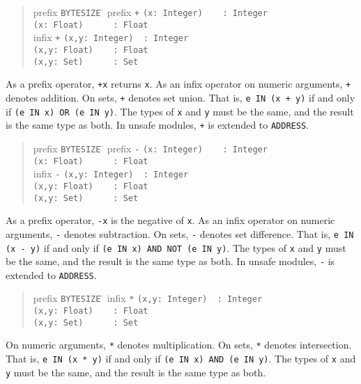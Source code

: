 \documentclass[10pt]{article}
\begin{document}
\begin{quote}
  \begin{tabbing}
    prefix \= \verb|BYTESIZE| \= \kill
    prefix \> \verb|+|       \> \verb|(x: Integer)    : Integer| \\
           \>                \> \verb|(x: Float)      : Float| \\
    infix  \> \verb|+|       \> \verb|(x,y: Integer)  : Integer| \\
           \>                \> \verb|(x,y: Float)    : Float| \\
           \>                \> \verb|(x,y: Set)      : Set|
  \end{tabbing}
\end{quote}
As a prefix operator, \verb|+x| returns \verb|x|.  As an infix operator on
numeric arguments, \verb|+| denotes addition.  On sets, \verb|+| denotes set
union.  That is, \verb|e IN (x + y)| if and only if
\verb|(e IN x) OR (e IN y)|.  The types of \verb|x| and \verb|y| must be the
same, and the result is the same type as both.  In unsafe modules, \verb|+| is
extended to \verb|ADDRESS|.

\begin{quote}
  \begin{tabbing}
    prefix \= \verb|BYTESIZE| \= \kill
    prefix \> \verb|-|       \> \verb|(x: Integer)    : Integer| \\
           \>                \> \verb|(x: Float)      : Float| \\
    infix  \> \verb|-|       \> \verb|(x,y: Integer)  : Integer| \\
           \>                \> \verb|(x,y: Float)    : Float| \\
           \>                \> \verb|(x,y: Set)      : Set|
  \end{tabbing}
\end{quote}
As a prefix operator, \verb|-x| is the negative of \verb|x|.  As an infix
operator on numeric arguments, \verb|-| denotes subtraction.  On sets,
\verb|-| denotes set difference.  That is, \verb|e IN (x - y)| if and only if
\verb|(e IN x) AND NOT (e IN y)|.  The types of \verb|x| and \verb|y| must be
the same, and the result is the same type as both.  In unsafe modules,
\verb|-| is extended to \verb|ADDRESS|.

\begin{quote}
  \begin{tabbing}
    prefix \= \verb|BYTESIZE| \= \kill
    infix  \> \verb|*|       \> \verb|(x,y: Integer)  : Integer| \\
           \>                \> \verb|(x,y: Float)    : Float| \\
           \>                \> \verb|(x,y: Set)      : Set|
  \end{tabbing}
\end{quote}
On numeric arguments, \verb|*| denotes multiplication.  On sets, \verb|*|
denotes intersection.  That is, \verb|e IN (x * y)| if and only if
\verb|(e IN x) AND (e IN y)|.  The types of \verb|x| and \verb|y| must be the
same, and the result is the same type as both.
\end{document}

